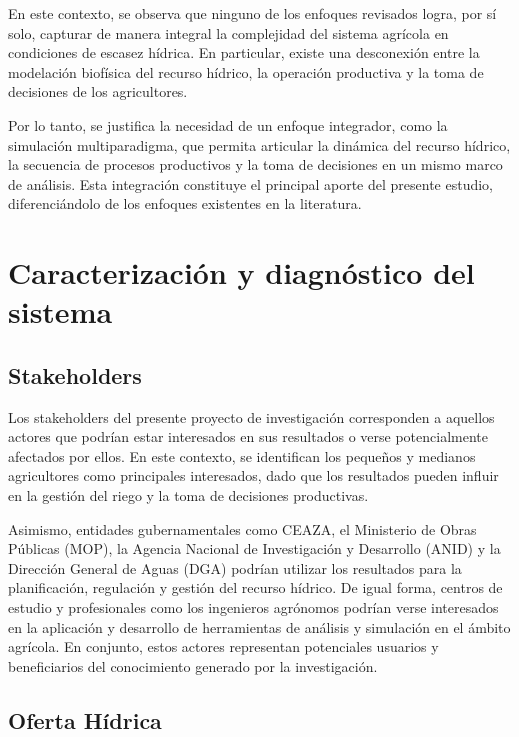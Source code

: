 \documentclass[12pt]{report}
\begin{document}
En este contexto, se observa que ninguno de los enfoques revisados logra, por sí solo, capturar de manera integral la complejidad del sistema agrícola en condiciones de escasez hídrica. En particular, existe una desconexión entre la modelación biofísica del recurso hídrico, la operación productiva y la toma de decisiones de los agricultores.

Por lo tanto, se justifica la necesidad de un enfoque integrador, como la simulación multiparadigma, que permita articular la dinámica del recurso hídrico, la secuencia de procesos productivos y la toma de decisiones en un mismo marco de análisis. Esta integración constituye el principal aporte del presente estudio, diferenciándolo de los enfoques existentes en la literatura.
\chapter{Caracterización y diagnóstico del sistema}

\section{Stakeholders}

Los stakeholders del presente proyecto de investigación corresponden a aquellos actores que podrían estar interesados en sus resultados o verse potencialmente afectados por ellos. En este contexto, se identifican los pequeños y medianos agricultores como principales interesados, dado que los resultados pueden influir en la gestión del riego y la toma de decisiones productivas.

Asimismo, entidades gubernamentales como CEAZA, el Ministerio de Obras Públicas (MOP), la Agencia Nacional de Investigación y Desarrollo (ANID) y la Dirección General de Aguas (DGA) podrían utilizar los resultados para la planificación, regulación y gestión del recurso hídrico. De igual forma, centros de estudio y profesionales como los ingenieros agrónomos podrían verse interesados en la aplicación y desarrollo de herramientas de análisis y simulación en el ámbito agrícola. En conjunto, estos actores representan potenciales usuarios y beneficiarios del conocimiento generado por la investigación.

\section{Oferta Hídrica}
\end{document}
